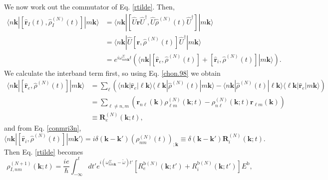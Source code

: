 We now work out the commutator of Eq. \eqref{rtilde}. Then,
\begin{align}\label{conmu1}
\langle n\mathbf{k}|
[\hat{\mathbf{r}}_{I}(t),\hat{\rho}^{(N)}_{I}(t)]
|m\mathbf{k}\rangle
&=
\langle n\mathbf{k}|
[\hat{U}\hat{\mathbf{r}}\hat{U}^\dagger,\hat{U}\hat{\rho}^{(N)}(t)\hat{U}^\dagger]
|m\mathbf{k}\rangle
\nonumber \\
&=
\langle n\mathbf{k}|
\hat{U}[\hat{\mathbf{r}},\hat{\rho}^{(N)}(t)]\hat{U}^\dagger
|m\mathbf{k}\rangle
\\
&=
e^{i\omega^\Sigma_{nm\mathbf{k}}t}
\left(
\langle n\mathbf{k}|
[\hat{\mathbf{r}}_e,\hat{\rho}^{(N)}(t)]
+
[\hat{\mathbf{r}}_i,\hat{\rho}^{(N)}(t)]
|m\mathbf{k}\rangle
\right)
\nonumber
.
\end{align}
We calculate the interband term first, so using Eq. \eqref{chon.98} we obtain
\begin{align}\label{conmu2}
\langle n\mathbf{k}|
[\hat{\mathbf{r}}_e,\hat{\rho}^{(N)}(t)]
|m\mathbf{k}\rangle
&=
\sum_{\ell}
\left(
\langle n\mathbf{k}|
\hat{\mathbf{r}}_e
|\ell\mathbf{k}\rangle
\langle \ell\mathbf{k}|
\hat{\rho}^{(N)}(t)
|m\mathbf{k}\rangle
-
\langle n\mathbf{k}|
\hat{\rho}^{(N)}(t)
|\ell\mathbf{k}\rangle
\langle \ell\mathbf{k}|
\hat{\mathbf{r}}_e
|m\mathbf{k}\rangle
\right)
\nonumber \\
&=
\sum_{\ell\ne n,m}
\left(
\mathbf{r}_{n\ell}(\mathbf{k})
\rho^{(N)}_{\ell m}(\mathbf{k};t)
-
\rho^{(N)}_{n\ell}(\mathbf{k};t)
\mathbf{r}_{\ell m}(\mathbf{k})
\right)
\nonumber\\
&\equiv
\mathbf{R}^{(N)}_e(\mathbf{k};t)
,
\end{align}
and from Eq. \eqref{conmri3n},
\begin{equation}\label{conmri4}
\langle n\mathbf{k}|
[\hat{\mathbf{r}}_i,\hat{\rho}^{(N)}(t)]
|m\mathbf{k}'\rangle
=i \delta(\mathbf{k}-\mathbf{k}') (\rho^{(N)}_{nm}(t))_{;\mathbf{k}}
\equiv \delta(\mathbf{k}-\mathbf{k}')\mathbf{R}_i^{(N)}(\mathbf{k};t).
\end{equation}
Then Eq. \eqref{rtilde} becomes
\begin{equation}\label{rtilde2}
\rho^{(N+1)}_{I,nm}(\mathbf{k};t)
=\frac{ie}{\hbar}\int_{-\infty}^t dt'
e^{i(\omega^\Sigma_{nm\mathbf{k}}-\tilde{\omega})t'}
\left[R_e^{\mathrm{b}(N)}(\mathbf{k};t')+R_i^{\mathrm{b}(N)}(\mathbf{k};t')\right]E^{\mathrm{b}}
,
\end{equation}
